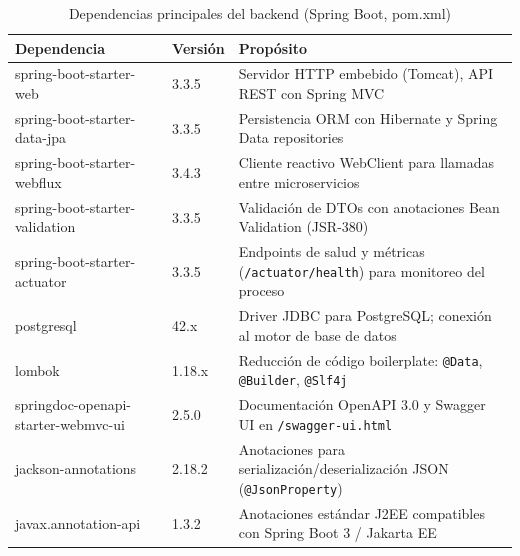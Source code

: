 \documentclass[12pt,a4paper,oneside]{report}
\begin{document}
\begin{table}[H]
\caption{Dependencias principales del backend (Spring Boot, pom.xml)}\label{tab:deps-backend}
\centering
\begin{tabularx}{\textwidth}{llX}
\toprule
\textbf{Dependencia} & \textbf{Versión} & \textbf{Propósito} \\
\midrule
spring-boot-starter-web & 3.3.5 & Servidor HTTP embebido (Tomcat), API REST con Spring MVC \\
spring-boot-starter-data-jpa & 3.3.5 & Persistencia ORM con Hibernate y Spring Data repositories \\
spring-boot-starter-webflux & 3.4.3 & Cliente reactivo WebClient para llamadas entre microservicios \\
spring-boot-starter-validation & 3.3.5 & Validación de DTOs con anotaciones Bean Validation (JSR-380) \\
spring-boot-starter-actuator & 3.3.5 & Endpoints de salud y métricas (\texttt{/actuator/health}) para monitoreo del proceso \\
postgresql & 42.x & Driver JDBC para PostgreSQL; conexión al motor de base de datos \\
lombok & 1.18.x & Reducción de código boilerplate: \texttt{@Data}, \texttt{@Builder}, \texttt{@Slf4j} \\
springdoc-openapi-starter-webmvc-ui & 2.5.0 & Documentación OpenAPI 3.0 y Swagger UI en \texttt{/swagger-ui.html} \\
jackson-annotations & 2.18.2 & Anotaciones para serialización/deserialización JSON (\texttt{@JsonProperty}) \\
javax.annotation-api & 1.3.2 & Anotaciones estándar J2EE compatibles con Spring Boot 3 / Jakarta EE \\
\bottomrule
\end{tabularx}
\end{table}
\end{document}
